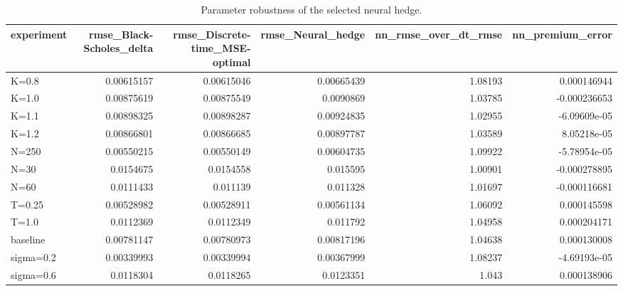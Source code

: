 \begin{table}
\caption{Parameter robustness of the selected neural hedge.}
\label{tab:parameter_robustness}
\begin{tabular}{lrrrrr}
\toprule
experiment & rmse_Black-Scholes_delta & rmse_Discrete-time_MSE-optimal & rmse_Neural_hedge & nn_rmse_over_dt_rmse & nn_premium_error \\
\midrule
K=0.8 & 0.00615157 & 0.00615046 & 0.00665439 & 1.08193 & 0.000146944 \\
K=1.0 & 0.00875619 & 0.00875549 & 0.0090869 & 1.03785 & -0.000236653 \\
K=1.1 & 0.00898325 & 0.00898287 & 0.00924835 & 1.02955 & -6.09609e-05 \\
K=1.2 & 0.00866801 & 0.00866685 & 0.00897787 & 1.03589 & 8.05218e-05 \\
N=250 & 0.00550215 & 0.00550149 & 0.00604735 & 1.09922 & -5.78954e-05 \\
N=30 & 0.0154675 & 0.0154558 & 0.015595 & 1.00901 & -0.000278895 \\
N=60 & 0.0111433 & 0.011139 & 0.011328 & 1.01697 & -0.000116681 \\
T=0.25 & 0.00528982 & 0.00528911 & 0.00561134 & 1.06092 & 0.000145598 \\
T=1.0 & 0.0112369 & 0.0112349 & 0.011792 & 1.04958 & 0.000204171 \\
baseline & 0.00781147 & 0.00780973 & 0.00817196 & 1.04638 & 0.000130008 \\
sigma=0.2 & 0.00339993 & 0.00339994 & 0.00367999 & 1.08237 & -4.69193e-05 \\
sigma=0.6 & 0.0118304 & 0.0118265 & 0.0123351 & 1.043 & 0.000138906 \\
\bottomrule
\end{tabular}
\end{table}
